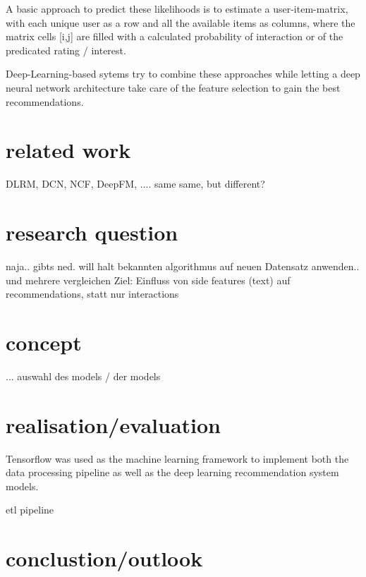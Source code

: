 \documentclass[10pt,draft,journal,a4paper,oneside,twocolumn]{IEEEtran}
\begin{document}

A basic approach to predict these likelihoods is to estimate a user-item-matrix, with each unique user as a row and all the available items as columns, where the matrix cells [i,j] are filled with a calculated probability of interaction or of the predicated rating / interest. 

Deep-Learning-based sytems try to combine these approaches while letting a deep neural network architecture take care of the feature selection to gain the best recommendations.

\section{related work}
DLRM, DCN, NCF, DeepFM, ....
same same, but different?
\section{research question}
naja.. gibts ned. will halt bekannten algorithmus auf neuen Datensatz anwenden.. und mehrere vergleichen
Ziel: Einfluss von side features (text) auf recommendations, statt nur interactions
\section{concept}
...
auswahl des models / der models
\section{realisation/evaluation}
Tensorflow was used as the machine learning framework to implement both the data processing pipeline as well as the  
deep learning recommendation system models.

etl pipeline

\section{conclustion/outlook}
\end{document}

